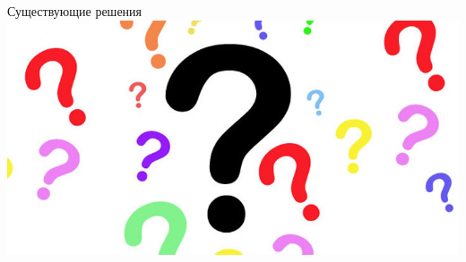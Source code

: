 \documentclass[sans]{beamer}
\begin{document}
\begin{frame}{Существующие решения}
	\includegraphics[width = \linewidth]{images/quiz_night.jpg}
\end{frame}
\end{document}
